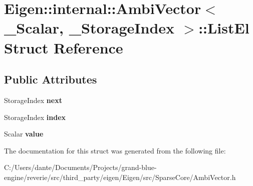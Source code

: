 \hypertarget{struct_eigen_1_1internal_1_1_ambi_vector_1_1_list_el}{}\section{Eigen\+::internal\+::Ambi\+Vector$<$ \+\_\+\+Scalar, \+\_\+\+Storage\+Index $>$\+::List\+El Struct Reference}
\label{struct_eigen_1_1internal_1_1_ambi_vector_1_1_list_el}
\subsection*{Public Attributes}
\begin{DoxyCompactItemize}
\item 
\mbox{\label{struct_eigen_1_1internal_1_1_ambi_vector_1_1_list_el_afa83f47291dd2114ca74ca28123d9f3f}} 
Storage\+Index {\bfseries next}
\item 
\mbox{\label{struct_eigen_1_1internal_1_1_ambi_vector_1_1_list_el_aa28af060dd302f09a6293a5cec0fac08}} 
Storage\+Index {\bfseries index}
\item 
\mbox{\label{struct_eigen_1_1internal_1_1_ambi_vector_1_1_list_el_a91c7be4cafca17e1fcffb06c4b2448ef}} 
Scalar {\bfseries value}
\end{DoxyCompactItemize}


The documentation for this struct was generated from the following file\+:\begin{DoxyCompactItemize}
\item 
C\+:/\+Users/dante/\+Documents/\+Projects/grand-\/blue-\/engine/reverie/src/third\+\_\+party/eigen/\+Eigen/src/\+Sparse\+Core/Ambi\+Vector.\+h\end{DoxyCompactItemize}
